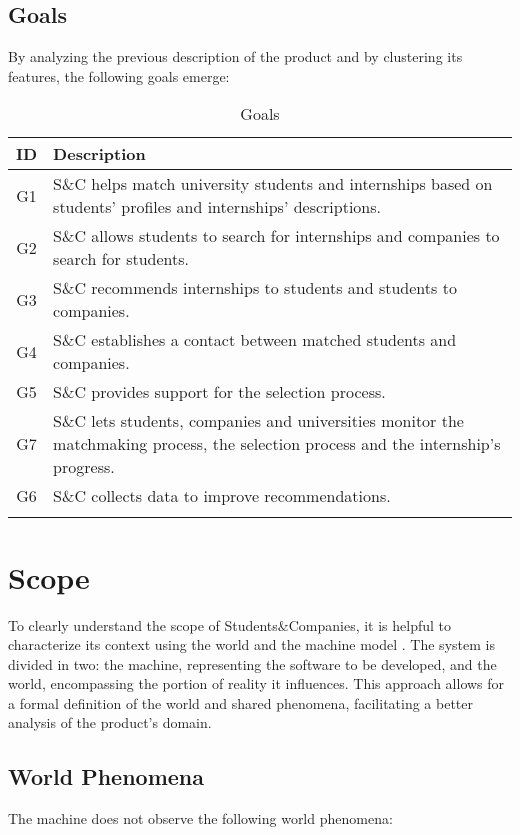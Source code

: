 \subsection{Goals}
By analyzing the previous description of the product and by clustering its features, the following goals emerge:

\renewcommand{\arraystretch}{1.5}
\begin{longtable}{|c|p{12.5cm}|}
    \hline \rowcolor{polimiblue!40}
    \textbf{ID} & \textbf{Description} \\ \hline
    G1 & S\&C helps match university students and internships based on students' profiles and internships' descriptions. \\ \hline
    G2 & S\&C allows students to search for internships and companies to search for students. \\ \hline
    G3 & S\&C recommends internships to students and students to companies. \\ \hline
    G4 & S\&C establishes a contact between matched students and companies. \\ \hline
    G5 & S\&C provides support for the selection process. \\ \hline
    G7 & S\&C lets students, companies and universities monitor the matchmaking process, the selection process and the internship's progress. \\ \hline
    G6 & S\&C collects data to improve recommendations. \\ \hline
\caption{Goals}
\end{longtable}

\section{Scope}
To clearly understand the scope of Students\&Companies, it is helpful to characterize its context using the world and the machine model \cite{jackson1995}.
The system is divided in two: the machine, representing the software to be developed, and the world, encompassing the portion of reality it influences.
This approach allows for a formal definition of the world and shared phenomena, facilitating a better analysis of the product's domain.

\subsection{World Phenomena}
The machine does not observe the following world phenomena:

